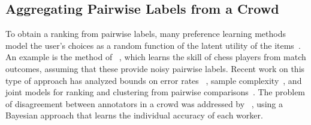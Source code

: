 \subsection{Aggregating Pairwise Labels from a Crowd} %


To obtain a ranking from pairwise labels, many preference learning methods model
the user's choices as a random function of the latent utility of the items~\citep{thurstone1927law}.
An example is the method of ~\citet{herbrich2007trueskill}, which learns the skill of chess players from 
match outcomes, assuming that these provide noisy pairwise labels.
Recent work on this type of approach has analyzed bounds on error rates ~\citep{chen2015spectral}, 
sample complexity~\citep{shah2015estimation}, and joint models for ranking and clustering from pairwise comparisons~\citep{li2018simultaneous}.
The problem of disagreement between annotators in a crowd was addressed by ~\citet{chen2013pairwise},
using a Bayesian approach that learns the individual accuracy of each worker.
